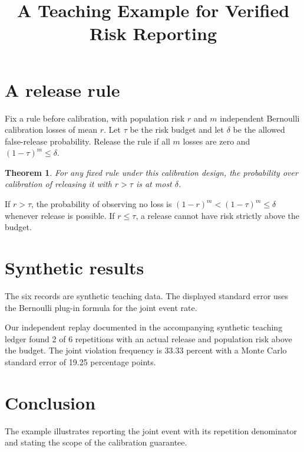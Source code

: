 \documentclass[11pt]{article}
\title{A Teaching Example for Verified Risk Reporting}
\author{}
\date{}
\newtheorem{theorem}{Theorem}
\begin{document}
\maketitle
\vspace{-2em}

\section{A release rule}
Fix a rule before calibration, with population risk $r$ and $m$ independent
Bernoulli calibration losses of mean $r$. Let $\tau$ be the risk budget and
let $\delta$ be the allowed false-release probability. Release the rule if
all $m$ losses are zero and $(1-\tau)^m\leq\delta$.

\begin{theorem}\label{thm:teaching-release}
For any fixed rule under this calibration design, the probability over
calibration of releasing it with $r>\tau$ is at most $\delta$.
\end{theorem}
If $r>\tau$, the probability of observing no loss is
$(1-r)^m < (1-\tau)^m \leq \delta$ whenever release is possible. If
$r\leq\tau$, a release cannot have risk strictly above the budget.

\section{Synthetic results}
The six records are synthetic teaching data. The displayed standard error
uses the Bernoulli plug-in formula for the joint event rate.

Our independent replay documented in the accompanying synthetic teaching ledger found 2 of 6 repetitions with an actual release and population risk above the budget. The joint violation frequency is 33.33 percent with a Monte Carlo standard error of 19.25 percentage points.

\section{Conclusion}
The example illustrates reporting the joint event with its repetition
denominator and stating the scope of the calibration guarantee.
\end{document}
